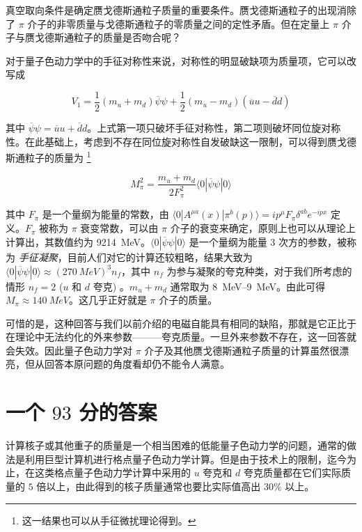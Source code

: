 \documentclass[oneside,a4paper,openany,11pt]{ctexbook}
\begin{document}
真空取向条件是确定赝戈德斯通粒子质量的重要条件。赝戈德斯通粒子的出现消除了 $\pi$ 介子的非零质量与戈德斯通粒子的零质量之间的定性矛盾。但在定量上 $\pi$ 介子与赝戈德斯通粒子的质量是否吻合呢？

对于量子色动力学中的手征对称性来说，对称性的明显破缺项为质量项，它可以改写成

\begin{equation}
    V_1 = \frac{1}{2} (m_u+m_d) \overline{\psi} \psi + \frac{1}{2} (m_u-m_d) (\overline{u}u-\overline{d}d)
\end{equation}

\noindent 其中 $\overline{\psi}\psi=\overline{u}u+\overline{d}d$。上式第一项只破坏手征对称性，第二项则破坏同位旋对称性。在此基础上，考虑到不存在同位旋对称性自发破缺这一限制，可以得到赝戈德斯通粒子的质量为 \footnote{这一结果也可以从手征微扰理论得到。}

\begin{equation}
    M_{\pi}^2 = \frac{m_u+m_d}{2 F_{\pi}^2} \langle 0 | \overline{\psi}\psi | 0\rangle
\end{equation}

\noindent 其中 $F_\pi$ 是一个量纲为能量的常数，由 $\langle 0 | A^{\mu a}(x) | \pi^b(p) \rangle = i p^\mu F_\pi \delta^{ab} e^{-ipx}$ 定义。$F_\pi$ 被称为 $\pi$ 衰变常数，可以由 $\pi$ 介子的衰变来确定，原则上也可以从理论上计算出，其数值约为 \qty{9214}{MeV}。$\langle 0 | \overline{\psi}\psi | 0 \rangle$ 是一个量纲为能量 $3$ 次方的参数，被称为 \emph{手征凝聚}，目前人们对它的计算还较粗略，结果大致为 $\langle 0 | \overline{\psi}\psi | 0 \rangle \approx (\qty{270}{MeV})^3 n_f$，其中 $n_f$ 为参与凝聚的夸克种类，对于我们所考虑的情形 $n_f=2$ ($u$ 和 $d$ 夸克) 。$m_u+m_d$ 通常取为 \qtyrange{8}{9}{MeV}。由此可得 $M_\pi\approx\qty{140}{MeV}$。这几乎正好就是 $\pi$ 介子的质量。

可惜的是，这种回答与我们以前介绍的电磁自能具有相同的缺陷，那就是它正比于在理论中无法约化的外来参数———夸克质量。一旦外来参数不存在，这一回答就会失效。因此量子色动力学对 $\pi$ 介子及其他赝戈德斯通粒子质量的计算虽然很漂亮，但从回答本原问题的角度看却仍不能令人满意。

\section{一个 $93$ 分的答案}

计算核子或其他重子的质量是一个相当困难的低能量子色动力学的问题，通常的做法是利用巨型计算机进行格点量子色动力学计算。但是由于技术上的限制，迄今为止，在这类格点量子色动力学计算中采用的 $u$ 夸克和 $d$ 夸克质量都在它们实际质量的 $5$ 倍以上，由此得到的核子质量通常也要比实际值高出 $30\%$ 以上。
\end{document}
